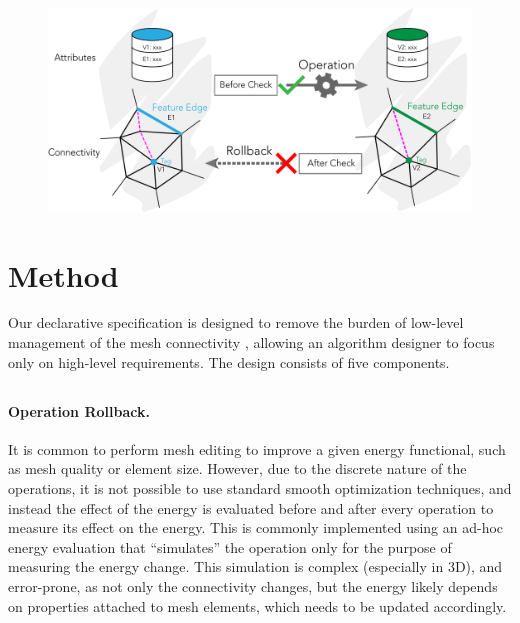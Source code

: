 \begin{figure}
    \centering\footnotesize
    \includegraphics[width=\linewidth]{wmtk-tex/figs/pipeline_illustration.pdf}
    \caption{}
    \label{fig:pipeline}
\end{figure}

\section{Method}

Our declarative specification is designed to remove the burden of low-level management of the mesh connectivity , allowing an algorithm designer to focus only on high-level requirements. The design consists of five components. 

\subsection{}

\paragraph{Operation Rollback.}
It is common to perform mesh editing to improve a given energy functional, such as mesh quality or element size. However, due to the discrete nature of the operations, it is not possible to use standard smooth optimization techniques, and instead the effect of the energy is evaluated before and after every operation to measure its effect on the energy. This is commonly implemented using an ad-hoc energy evaluation that ``simulates'' the operation only for the purpose of measuring the energy change. This simulation is complex (especially in 3D), and error-prone, as not only the connectivity changes, but the energy likely depends on properties attached to mesh elements, which needs to be updated accordingly.


